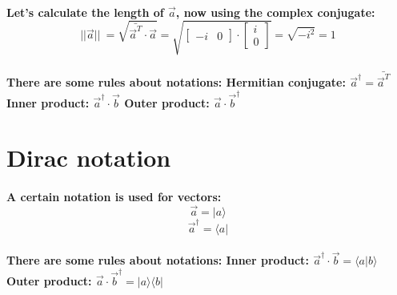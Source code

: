 \documentclass[11pt]{report}
\begin{document}
    \paragraph{
    Let's calculate the length of \(\vec{a}\), now using the complex conjugate:
    \[\lvert\lvert\vec{a}\lvert\lvert\ = \sqrt{\bar{\vec{a}^T} \cdot \vec{a} } = \sqrt{\begin{bmatrix} -i & 0 \end{bmatrix} \cdot \begin{bmatrix} i \\ 0 \end{bmatrix}} = \sqrt{-i^2} = 1\]
    }

    \paragraph{
    There are some rules about notations: \newline
    Hermitian conjugate: \(\vec{a}^\dagger = \bar{\vec{a}^T}\) \newline
    Inner product: \(\vec{a}^\dagger \cdot \vec{b}\) \newline
    Outer product: \(\vec{a} \cdot \vec{b}^\dagger\) \newline
    }

    \newpage

    \section{Dirac notation}

    \paragraph{
    A certain notation is used for vectors: \[ \vec{a} = |a\rangle\] \[ \vec{a}^\dagger = \langle a |\]}

    \paragraph{
    There are some rules about notations: \newline
    Inner product: \(\vec{a}^\dagger \cdot \vec{b} = \langle a | b \rangle\) \newline
    Outer product: \(\vec{a} \cdot \vec{b}^\dagger = | a \rangle\langle b |\) \newline
    }
\end{document}
